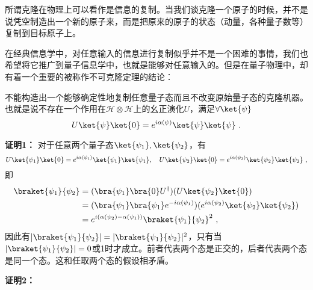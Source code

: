 
\begin{issues}
\issueDraft
\end{issues}

所谓克隆在物理上可以看作是信息的复制。当我们谈克隆一个原子的时候，并不是说凭空制造出一个新的原子来，而是把原来的原子的状态（动量，各种量子数等）复制到目标原子上。

在经典信息学中，对任意输入的信息进行复制似乎并不是一个困难的事情，我们也希望将它推广到量子信息学中，也就是能够对任意输入的。但是在量子物理中，却有着一个重要的被称作不可克隆定理的结论：
\begin{theorem}{}
不能构造出一个能够确定性地复制任意量子态而且不改变原始量子态的克隆机器。也就是说不存在一个作用在$\mathcal{H}\otimes\mathcal{H}$上的幺正演化$U$，满足$\forall\ket{\psi}$
\begin{equation}
U\ket{\psi}\ket{0}=e^{i\alpha(\psi)}\ket{\psi}\ket{\psi}~.
\end{equation}
\end{theorem}

\textbf{证明1：}
对于任意两个量子态$\ket{\psi_1},\ket{\psi_2}$，有\begin{equation}
 U\ket{\psi_1}\ket{0}=e^{i\alpha(\psi_1)}\ket{\psi_1}\ket{\psi_1},\quad U\ket{\psi_2}\ket{0}=e^{i\alpha(\psi_2)}\ket{\psi_2}\ket{\psi_2}~,
\end{equation}
即
\begin{equation}
\begin{aligned}
\braket{\psi_1}{\psi_2} &=(\bra{\psi_1}\bra{0}U^\dagger)(U\ket{\psi_2}\ket{0})\\
&=(\bra{\psi_1}\bra{\psi_1}e^{-i\alpha(\psi_1)})(e^{i\alpha(\psi_2)}\ket{\psi_2}\ket{\psi_2})\\
&=e^{i(\alpha(\psi_2)-\alpha(\psi_1))}\braket{\psi_1}{\psi_2}^2~,
\end{aligned}
\end{equation}
因此有$|\braket{\psi_1}{\psi_2}|=|\braket{\psi_1}{\psi_2}|^2$，只有当$|\braket{\psi_1}{\psi_2}|=0$或1时才成立。前者代表两个态是正交的，后者代表两个态是同一个态。这和任取两个态的假设相矛盾。

\textbf{证明2：}



